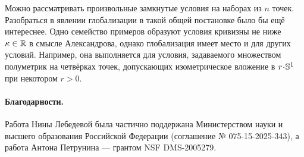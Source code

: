 Можно рассматривать произвольные замкнутые условия на наборах из $n$ точек.
Разобраться в явлении глобализации в такой общей постановке было бы ещё интереснее.
Одно семейство примеров образуют условия кривизны не ниже $\kappa\in \mathbb{R}$ в смысле Александрова, однако глобализация имеет место и для других условий.
Например, она выполняется для условия, задаваемого множеством полуметрик на четвёрках точек, допускающих изометрическое вложение в $r\cdot\SSS^1$ при некотором $r>0$.

\paragraph{Благодарности.}
Работа Нины Лебедевой была частично поддержана Министерством науки и высшего образования Российской Федерации (соглашение № 075-15-2025-343), а работа Антона Петрунина --- грантом NSF DMS-2005279.
